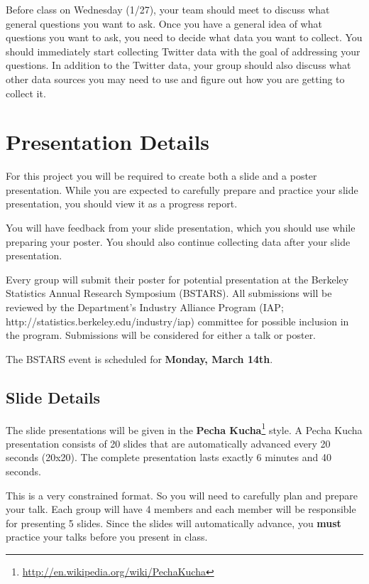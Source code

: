 \documentclass[11pt, oneside]{article}   	%
\begin{document}
Before class on Wednesday (1/27), your team should meet to discuss what general
questions you want to ask.  Once you have a general idea of what questions you
want to ask, you need to decide what data you want to collect.  You should
immediately start collecting Twitter data with the goal of addressing your
questions.  In addition to the Twitter data, your group should also discuss
what other data sources you may need to use and figure out how you are getting
to collect it.



\section{Presentation Details}

For this project you will be required to create both a slide and a poster
presentation.  While you are expected to carefully prepare and practice your
slide presentation, you should view it as a progress report.

You will have feedback from your slide presentation, which you should use
while preparing your poster.  You should also continue collecting data
after your slide presentation.

Every group will submit their poster for potential presentation at the Berkeley
Statistics Annual Research Symposium (BSTARS).  All submissions will be
reviewed by the Department's Industry Alliance Program (IAP;
http://statistics.berkeley.edu/industry/iap) committee for possible inclusion
in the program.  Submissions will be considered for either a talk or poster.

The BSTARS event is scheduled for \textbf{Monday, March 14th}.

\subsection{Slide Details}

The slide presentations will be given in the \textbf{Pecha
Kucha}\footnote{\url{http://en.wikipedia.org/wiki/PechaKucha}} style.  A Pecha
Kucha presentation consists of 20 slides that are automatically advanced every
20 seconds (20x20).  The complete presentation lasts exactly 6 minutes and 40
seconds.

This is a very constrained format.  So you will need to carefully plan and
prepare your talk.  Each group will have 4 members and each member will be
responsible for presenting 5 slides.  Since the slides will automatically
advance, you \textbf{must} practice your talks before you present in class.
\end{document}
